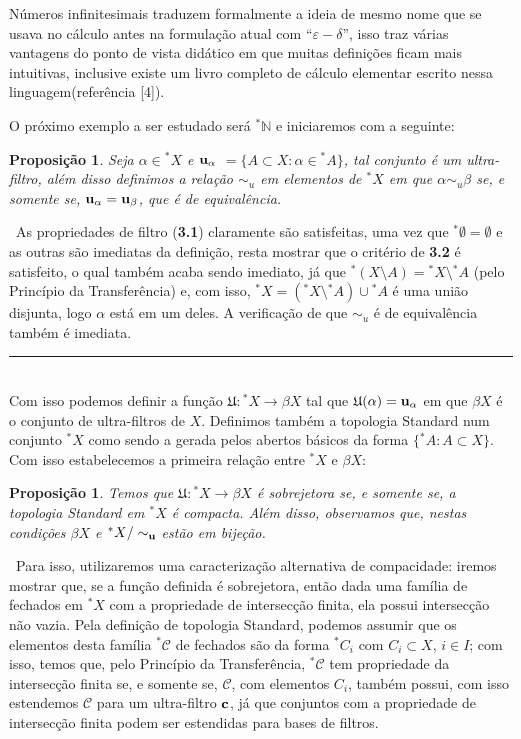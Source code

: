 \documentclass[11pt,a4paper]{article}
\newtheorem{prop}[mydef]{Proposição}
\def\dem{\par\smallbreak\noindent {\textit{ Demonstração:}} \ }
\def\eop{\hfill\rule{2.5mm}{2.5mm} \\ }
\theoremstyle{definition}
\begin{document}
Números infinitesimais traduzem formalmente a ideia de mesmo nome que se usava no cálculo antes na formulação atual com ``$\varepsilon -\delta$'', isso traz várias vantagens do ponto de vista didático em que muitas definições ficam mais intuitivas, inclusive existe um livro completo de cálculo elementar escrito nessa linguagem(referência [4]).    

O próximo exemplo a ser estudado será $^*\mathbb{N}$ e iniciaremos com a seguinte:


\begin{prop}
	
	Seja $\alpha \in {^*X}$  e $ \bf{u}_\alpha$ $=\{A\subset X : \alpha\in {^*A} \} $, tal conjunto é um ultra-filtro, além disso definimos a relação $\sim_{u}$ em elementos de ${^*X}$ em que $\alpha \sim_{u} \beta$ se, e somente se, $\bf{u}_\alpha=\bf{u}_\beta $, que é de equivalência. 
	
\end{prop}  

\dem As propriedades de filtro (\textbf{3.1}) claramente são satisfeitas, uma vez que $^*\emptyset = \emptyset$ e as outras são imediatas da definição, resta mostrar que o critério de \textbf{3.2} é satisfeito, o qual também acaba sendo imediato, já que $^*(X\setminus A)={^*X}\setminus{^*A}$ (pelo Princípio da Transferência) e, com isso, ${^*X}=({^*X}\setminus{^*A}) \cup {^*A}$ é uma união disjunta, logo $\alpha$ está em um deles. A verificação de que $\sim_{u}$ é de equivalência também é imediata. \eop



Com isso podemos definir a função $\mathfrak{U}: {^*X}\rightarrow \beta X$ tal que $\mathfrak{U}(\alpha)=\bf{u}_\alpha$ em que $\beta X$ é o conjunto de ultra-filtros de $X$. Definimos também a topologia Standard num conjunto $^*X$ como sendo a gerada pelos abertos básicos da forma $\{ {^*A}:A\subset X \}$. Com isso estabelecemos a primeira relação entre $^*X$ e $\beta X$:

\begin{prop}
	
	Temos que $\mathfrak{U}: {^*X}\rightarrow \beta X$ é sobrejetora se, e somente se, a topologia Standard em $^*X$ é compacta. Além disso, observamos que, nestas condições $\beta X$ e ${^*X}/ \sim_{\bf{u} }$ estão em bijeção.
	
\end{prop}

\dem Para isso, utilizaremos uma caracterização alternativa de compacidade: iremos mostrar que, se a função definida é sobrejetora, então dada uma família de fechados em ${^*X}$ com a propriedade de intersecção finita, ela possui intersecção não vazia. Pela definição de topologia Standard, podemos assumir que os elementos desta família $^*\mathcal{C}$ de fechados são da forma $^*C_i$ com $C_i\subset X$, $i\in I$; com isso, temos que, pelo Princípio da Transferência,  $^*\mathcal{C}$ tem propriedade da intersecção finita se, e somente se,  $\mathcal{C}$, com elementos $C_i$, também possui, com isso estendemos $\mathcal{C}$ para um ultra-filtro $\bf{c}$, já que conjuntos com a propriedade de intersecção finita podem ser estendidas para bases de filtros. 
\end{document}
